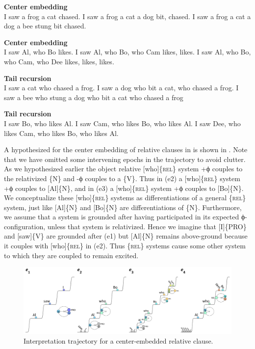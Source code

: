\ea\label{ex:6:15}
\textbf{Center embedding}\\
    \ea I saw a frog a cat chased.                      
    \ex I saw a frog a cat a dog bit, chased.  
    \ex I saw a frog a cat a dog a bee stung bit chased.
    \z
\z

\ea\label{ex:6:16}
\textbf{Center embedding}\\
    \ea\label{ex:6:16a} I saw Al, who Bo likes.                                
    \ex\label{ex:6:16b} I saw Al, who Bo, who Cam likes, likes.                
    \ex\label{ex:6:16c} I saw Al, who Bo, who Cam, who Dee likes, likes, likes.
    \z
\z

\ea\label{ex:6:17}
\textbf{Tail recursion}\\
    \ea I saw a cat who chased a frog.
    \ex I saw a dog who bit a cat, who chased a frog.
    \ex I saw a bee who stung a dog who bit a cat who chased a frog
    \z
\z

\ea\label{ex:6:18}
\textbf{Tail recursion}\\
    \ea I saw Bo, who likes Al.
    \ex\label{ex:6:18b} I saw Cam, who likes Bo, who likes Al.
    \ex\label{ex:6:18c} I saw Dee, who likes Cam, who likes Bo, who likes Al.
    \z
\z
  

  A hypothesized  for the center embedding of relative clauses in  is shown in {}. Note that we have omitted some intervening epochs in the trajectory to avoid clutter. As we hypothesized earlier the object relative [who]\{\textsc{rel}\} system +ϕ couples to the relativized \{N\} and -ϕ couples to a \{V\}. Thus in (e2) a [who]\{\textsc{rel}\} system +ϕ couples to [Al]\{N\}, and in (e3) a [who]\{\textsc{rel}\} system +ϕ couples to [Bo]\{N\}. We conceptualize these [who]\{\textsc{rel}\} systems as differentiations of a general \{\textsc{rel}\} system, just like [Al]\{N\} and [Bo]\{N\} are differentiations of \{N\}. Furthermore, we assume that a system is grounded after having participated in its expected ϕ-configuration, unless that system is relativized. Hence we imagine that [I]\{\textsc{PRO}\} and [saw]\{V\} are grounded after (e1) but [Al]\{N\} remains above-ground because it couples with [who]\{\textsc{rel}\} in (e2). Thus \{\textsc{rel}\} systems cause some other system to which they are coupled to remain excited.

  
\begin{figure}
\includegraphics[width=\textwidth]{figures/Tilsen-img132.png}
\caption{Interpretation trajectory for a center-embedded relative clause.}
\label{fig:6:13}
\end{figure}
 

